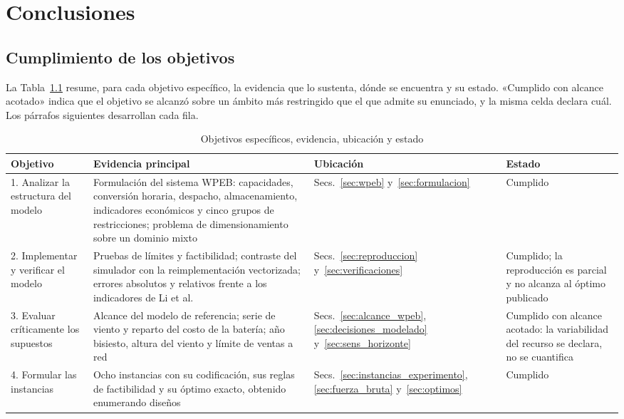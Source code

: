 \chapter{Conclusiones}

\section{Cumplimiento de los objetivos}

La Tabla~\ref{tab:cumplimiento} resume, para cada objetivo específico, la evidencia que lo sustenta, dónde se encuentra y su estado. «Cumplido con alcance acotado» indica que el objetivo se alcanzó sobre un ámbito más restringido que el que admite su enunciado, y la misma celda declara cuál. Los párrafos siguientes desarrollan cada fila.

\begin{table}[H]
\centering
\scriptsize
\caption{Objetivos específicos, evidencia, ubicación y estado}
\label{tab:cumplimiento}
\renewcommand{\arraystretch}{1.25}
\begin{tabular}{@{}p{2.6cm} p{6.1cm} p{2.2cm} p{2.7cm}@{}}
\hline
\textbf{Objetivo} & \textbf{Evidencia principal} & \textbf{Ubicación} & \textbf{Estado} \tabularnewline
\hline
\raggedright 1. Analizar la estructura del modelo & \raggedright Formulación del sistema WPEB: capacidades, conversión horaria, despacho, almacenamiento, indicadores económicos y cinco grupos de restricciones; problema de dimensionamiento sobre un dominio mixto & \raggedright Secs.~\ref{sec:wpeb} y~\ref{sec:formulacion} & \raggedright Cumplido \tabularnewline
\raggedright 2. Implementar y verificar el modelo & \raggedright Pruebas de límites y factibilidad; contraste del simulador con la reimplementación vectorizada; errores absolutos y relativos frente a los indicadores de Li et al. & \raggedright Secs.~\ref{sec:reproduccion} y~\ref{sec:verificaciones} & \raggedright Cumplido; la reproducción es parcial y no alcanza al óptimo publicado \tabularnewline
\raggedright 3. Evaluar críticamente los supuestos & \raggedright Alcance del modelo de referencia; serie de viento y reparto del costo de la batería; año bisiesto, altura del viento y límite de ventas a red & \raggedright Secs.~\ref{sec:alcance_wpeb}, \ref{sec:decisiones_modelado} y~\ref{sec:sens_horizonte} & \raggedright Cumplido con alcance acotado: la variabilidad del recurso se declara, no se cuantifica \tabularnewline
\raggedright 4. Formular las instancias & \raggedright Ocho instancias con su codificación, sus reglas de factibilidad y su óptimo exacto, obtenido enumerando \BruteForceDesignsTotal{} diseños & \raggedright Secs.~\ref{sec:instancias_experimento}, \ref{sec:fuerza_bruta} y~\ref{sec:optimos} & \raggedright Cumplido \tabularnewline

\end{tabular}
\end{table}

